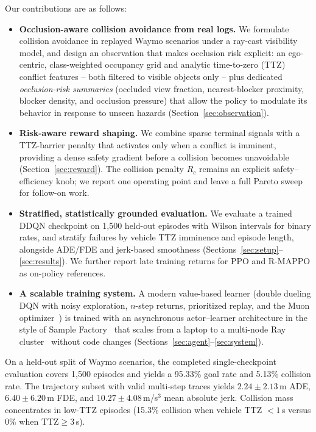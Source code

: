 \documentclass{article}
\begin{document}
Our contributions are as follows:
\begin{itemize}
  \item \textbf{Occlusion-aware collision avoidance from real logs.} We
  formulate collision avoidance in replayed Waymo scenarios under a
  ray-cast visibility model, and design an observation that makes occlusion
  risk explicit: an ego-centric, class-weighted occupancy grid and analytic
  time-to-zero (TTZ) conflict features -- both filtered to visible objects
  only -- plus dedicated \emph{occlusion-risk summaries} (occluded view
  fraction, nearest-blocker proximity, blocker density, and occlusion
  pressure) that allow the policy to modulate its behavior in response to
  unseen hazards (Section~\ref{sec:observation}).
  \item \textbf{Risk-aware reward shaping.} We combine sparse terminal
  signals with a TTZ-barrier penalty that activates only when a conflict is
  imminent, providing a dense safety gradient before a collision becomes
  unavoidable (Section~\ref{sec:reward}). The collision penalty $R_c$ remains
  an explicit safety--efficiency knob; we report one operating point and leave
  a full Pareto sweep for follow-on work.
  \item \textbf{Stratified, statistically grounded evaluation.} We evaluate a
  trained DDQN checkpoint on 1{,}500 held-out episodes with Wilson intervals
  for binary rates, and stratify failures by vehicle TTZ imminence and
  episode length, alongside ADE/FDE and jerk-based smoothness
  (Sections~\ref{sec:setup}--\ref{sec:results}). We further report late
  training returns for PPO and R-MAPPO as on-policy references.
  \item \textbf{A scalable training system.} A modern value-based learner
  (double dueling DQN with noisy exploration, $n$-step returns, prioritized
  replay, and the Muon optimizer~\citep{jordan2024muon}) is trained with an
  asynchronous actor--learner architecture in the style of Sample
  Factory~\citep{petrenko2020sample} that scales from a laptop to a
  multi-node Ray cluster~\citep{moritz2018ray} without code changes
  (Sections~\ref{sec:agent}--\ref{sec:system}).
\end{itemize}

On a held-out split of Waymo scenarios, the completed single-checkpoint
evaluation covers 1{,}500 episodes and yields a 95.33\% goal rate and 5.13\%
collision rate. The trajectory subset with valid multi-step traces yields
$2.24 \pm 2.13$\,m ADE, $6.40 \pm 6.20$\,m FDE, and
$10.27 \pm 4.08$\,m/s$^3$ mean absolute jerk. Collision mass concentrates in
low-TTZ episodes (15.3\% collision when vehicle TTZ $<1$\,s versus 0\% when
$\mathrm{TTZ}\ge 3$\,s).
\end{document}
